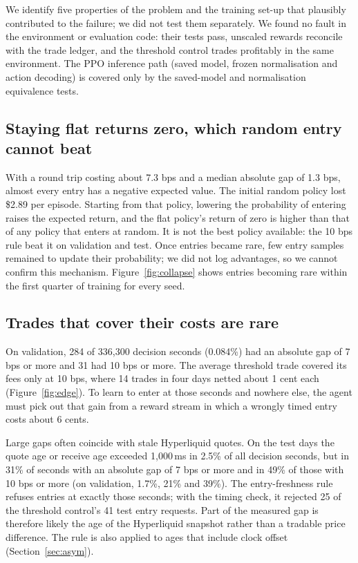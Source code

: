 \documentclass[12pt,a4paper]{article}
\DeclareRobustCommand{\bps}{\ifmmode\,\text{bps}\else\,bps\fi}
\begin{document}
We identify five properties of the problem and the training set-up that plausibly
contributed to the failure; we did not test them separately. We found no fault in the
environment or evaluation code: their tests pass, unscaled rewards reconcile with the trade
ledger, and the threshold control trades profitably in the same environment. The PPO
inference path (saved model, frozen normalisation and action decoding) is covered only by the
saved-model and normalisation equivalence tests.

\subsection{Staying flat returns zero, which random entry cannot beat}
With a round trip costing about 7.3\bps{} and a median absolute gap of 1.3\bps, almost every
entry has a negative expected value. The initial random policy lost \$2.89 per episode.
Starting from that policy, lowering the probability of entering raises the expected return,
and the flat policy's return of zero is higher than that of any policy that enters at random.
It is not the best policy available: the 10\bps{} rule beat it on validation and test. Once
entries became rare, few entry samples remained to update their probability; we did not log
advantages, so we cannot confirm this mechanism. Figure~\ref{fig:collapse} shows entries
becoming rare within the first quarter of training for every seed.

\subsection{Trades that cover their costs are rare}\label{sec:rare}
On validation, 284 of 336,300 decision seconds (0.084\%) had an absolute gap of 7\bps{} or
more and 31 had 10\bps{} or more. The average threshold trade covered its fees only at
10\bps, where 14 trades in four days netted about 1 cent each (Figure~\ref{fig:edge}). To
learn to enter at those seconds and nowhere else, the agent must pick out that gain from a
reward stream in which a wrongly timed entry costs about 6 cents.

Large gaps often coincide with stale Hyperliquid quotes. On the test days the quote age or
receive age exceeded 1,000\,ms in 2.5\% of all decision seconds, but in 31\% of seconds with
an absolute gap of 7\bps{} or more and in 49\% of those with 10\bps{} or more (on validation,
1.7\%, 21\% and 39\%). The entry-freshness rule refuses entries at exactly those seconds;
with the timing check, it rejected 25 of the threshold control's 41 test entry requests. Part
of the measured gap is therefore likely the age of the Hyperliquid snapshot rather than a
tradable price difference. The rule is also applied to ages that include clock offset
(Section~\ref{sec:asym}).
\end{document}
